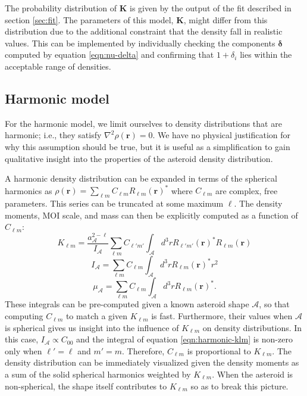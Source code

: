 The probability distribution of $\bm K$ is given by the output of the fit described in section \ref{sec:fit}. The parameters of this model, $\bm K$, might differ from this distribution due to the additional constraint that the density fall in realistic values. This can be implemented by individually checking the components $\bm \delta$ computed by equation \ref{eqn:nu-delta} and confirming that $1 + \delta_i$ lies within the acceptable range of densities.


\subsection{Harmonic model}
For the harmonic model, we limit ourselves to density distributions that are harmonic; i.e., they satisfy $\nabla^2 \rho(\bm r) = 0$. We have no physical justification for why this assumption should be true, but it is useful as a simplification to gain qualitative insight into the properties of the asteroid density distribution.

A harmonic density distribution can be expanded in terms of the spherical harmonics as $\rho(\bm r) = \sum_{\ell m} C_{\ell m} R_{\ell m}(\bm r)^*$ where $C_{\ell m}$ are complex, free parameters. This series can be truncated at some maximum $\ell$. The density moments, MOI scale, and mass can then be explicitly computed as a function of $C_{\ell m}$:
\begin{equation}
  K_{\ell m} = \frac{a_\mathcal{A}^{2-\ell}}{I_\mathcal{A}} \sum_{\ell m} C_{\ell' m'} \int_\mathcal{A} d^3 r R_{\ell' m'}(\bm r)^* R_{\ell m}(\bm r)
  \label{eqn:harmonic-klm}
\end{equation}
\begin{equation}
  I_\mathcal{A} = \sum_{\ell m} C_{\ell m} \int_\mathcal{A} d^3 r R_{\ell m}(\bm r)^* r^2
  \label{eqn:harmonic-ia}
\end{equation}
\begin{equation}
  \mu_\mathcal{A} = \sum_{\ell m} C_{\ell m} \int_\mathcal{A} d^3 r R_{\ell m}(\bm r)^*.
  \label{eqn:harmonic-mass}
\end{equation}
These integrals can be pre-computed given a known asteroid shape $\mathcal{A}$, so that computing $C_{\ell m}$ to match a given $K_{\ell m}$ is fast. Furthermore, their values when $\mathcal{A}$ is spherical gives us insight into the influence of $K_{\ell m}$ on density distributions. In this case, $I_\mathcal{A} \propto C_{00}$ and the integral of equation \ref{eqn:harmonic-klm} is non-zero only when $\ell' = \ell$ and $m'=m$. Therefore, $C_{\ell m}$ is proportional to $K_{\ell m}$. The density distribution can be immediately visualized given the density moments as a sum of the solid spherical harmonics weighted by $K_{\ell m}$. When the asteroid is non-spherical, the shape itself contributes to $K_{\ell m}$ so as to break this picture.

